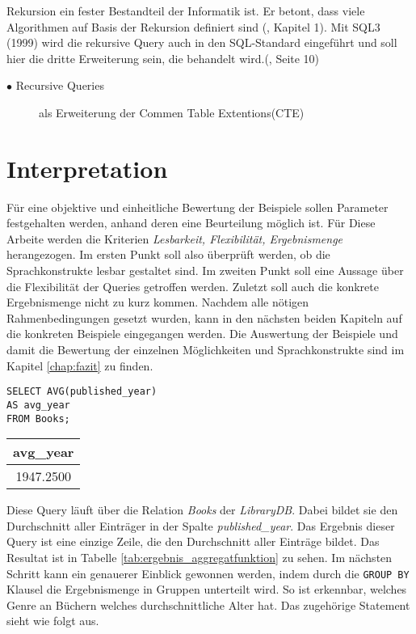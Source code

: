Rekursion ein fester Bestandteil der Informatik ist. Er betont, dass viele
Algorithmen auf Basis der Rekursion definiert sind (\cite{4460710}, Kapitel 1).
Mit SQL3 (1999) wird die rekursive Query auch in den SQL-Standard eingeführt und
soll hier die dritte Erweiterung sein, die behandelt wird.(\cite{grust2017advanced},
Seite 10)

\begin{description}
	\item[$\bullet$ Recursive Queries] als Erweiterung der Commen Table Extentions(CTE)
\end{description}


\section{Interpretation}
\label{sec:interpretatin} Für eine objektive und einheitliche Bewertung der Beispiele
sollen Parameter festgehalten werden, anhand deren eine Beurteilung möglich ist.
Für Diese Arbeite werden die Kriterien \textit{Lesbarkeit, Flexibilität,
Ergebnismenge} herangezogen. Im ersten Punkt soll also überprüft werden, ob die
Sprachkonstrukte lesbar gestaltet sind. Im zweiten Punkt soll eine Aussage über die
Flexibilität der Queries getroffen werden. Zuletzt soll auch die konkrete
Ergebnismenge nicht zu kurz kommen. Nachdem alle nötigen Rahmenbedingungen gesetzt
wurden, kann in den nächsten beiden Kapiteln auf die konkreten Beispiele
eingegangen werden. Die Auswertung der Beispiele und damit die Bewertung der einzelnen
Möglichkeiten und Sprachkonstrukte sind im Kapitel \ref{chap:fazit} zu finden.

\begin{minipage}{0.55\textwidth}
	 \begin{lstlisting}
SELECT AVG(published_year)
AS avg_year
FROM Books;
	\end{lstlisting}
\end{minipage}
\hfill
\begin{minipage}{0.45\textwidth}
	\centering
	\begin{tabular}{|c|}
		\hline
		\textbf{avg\_year} \\
		\hline
		1947.2500          \\
		\hline
	\end{tabular}
	 \label{tab:ergebnis_aggregatfunktion}
\end{minipage}

Diese Query läuft über die Relation \textit{Books} der \textit{LibraryDB}. Dabei
bildet sie den Durchschnitt aller Einträger in der Spalte \textit{published\_year}.
Das Ergebnis dieser Query ist eine einzige Zeile, die den Durchschnitt aller
Einträge bildet. Das Resultat ist in Tabelle \ref{tab:ergebnis_aggregatfunktion}
zu sehen. Im nächsten Schritt kann ein genauerer Einblick gewonnen werden, indem
durch die \texttt{GROUP BY} Klausel die Ergebnismenge in Gruppen unterteilt wird.
So ist erkennbar, welches Genre an Büchern welches durchschnittliche Alter hat. Das
zugehörige Statement sieht wie folgt aus.